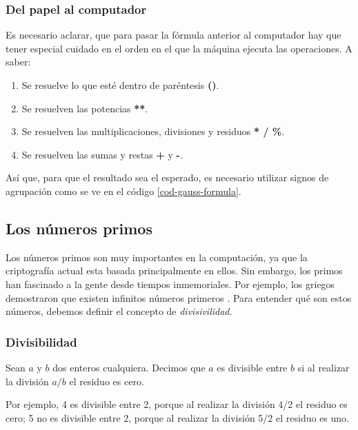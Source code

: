 \subsubsection{Del papel al computador}

Es necesario aclarar, que para pasar la fórmula anterior al computador hay que tener especial cuidado en el orden en el que la máquina ejecuta las operaciones. A saber:

	\begin{enumerate}
	\item Se resuelve lo que esté dentro de paréntesis \textbf{()}.
	\item Se resuelven las potencias \textbf{**}.
	\item Se resuelven las multiplicaciones, divisiones y residuos  \textbf{* / \%}. 
	\item Se resuelven las sumas y restas  \textbf{+} y \textbf{-}.
	\end{enumerate}
	
Así que, para que el resultado sea el esperado, es necesario utilizar signos de agrupación como se ve en el código \ref{cod-gauss-formula}. \\




\subsection{Los números primos}

Los números primos son muy importantes en la computación, ya que la criptografía actual esta basada principalmente en ellos. Sin embargo, los primos han fascinado a la gente desde tiempos inmemoriales. Por ejemplo, los griegos demostraron que existen infinitos números primeros \cite{discretemath}. Para entender qué son estos números, debemos definir el concepto de \emph{divisivilidad}.

\subsubsection{Divisibilidad}

Sean $a$ y $b$ dos enteros cualquiera. Decimos que $a$ es divisible entre $b$ si al realizar la división $a/b$ el residuo es cero.

Por ejemplo, 4 es divisible entre 2, porque al realizar la división 4/2 el residuo es cero; 5 no es divisible entre 2, porque al realizar la división 5/2 el residuo es uno.

